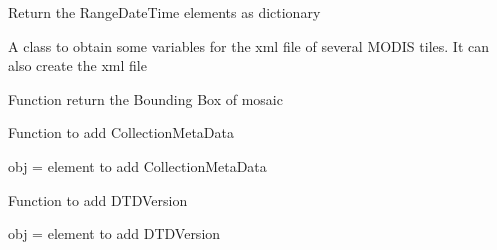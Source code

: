 \documentclass[a4paper,11pt,oneside]{sphinxmanual}
\begin{document}
\begin{fulllineitems}
\begin{fulllineitems}
\end{fulllineitems}


\begin{fulllineitems}
\label{pymodis/pymodis:pymodis.parsemodis.parseModis.retRangeTime}
Return the RangeDateTime elements as dictionary

\end{fulllineitems}


\end{fulllineitems}


\begin{fulllineitems}
\label{pymodis/pymodis:pymodis.parsemodis.parseModisMulti}
A class to obtain some variables for the xml file of several MODIS tiles.
It can also create the xml file

\begin{fulllineitems}
\label{pymodis/pymodis:pymodis.parsemodis.parseModisMulti.valBound}
Function return the Bounding Box of mosaic

\end{fulllineitems}


\begin{fulllineitems}
\label{pymodis/pymodis:pymodis.parsemodis.parseModisMulti.valCollectionMetaData}
Function to add CollectionMetaData

obj = element to add CollectionMetaData

\end{fulllineitems}


\begin{fulllineitems}
\label{pymodis/pymodis:pymodis.parsemodis.parseModisMulti.valDTD}
Function to add DTDVersion

obj = element to add DTDVersion


\end{fulllineitems}
\end{fulllineitems}
\end{document}
